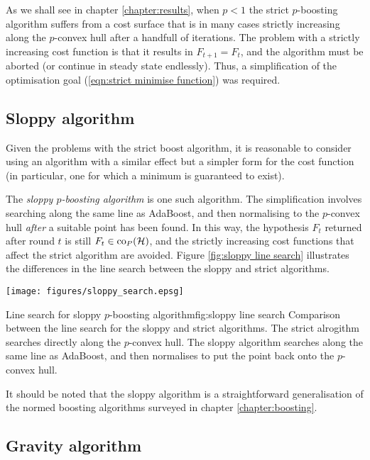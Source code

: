 As we shall see in chapter \ref{chapter:results}, when $p < 1$ the
strict $p$-boosting algorithm suffers from a cost surface that is in
many cases strictly increasing along the $p$-convex hull after a
handfull of iterations.  The problem with a strictly increasing cost
function is that it results in $F_{t+1} = F_t$, and the algorithm must
be aborted (or continue in steady state endlessly).  Thus, a
simplification of the optimisation goal (\ref{eqn:strict minimise
function}) was required.


\subsection{Sloppy algorithm}

Given the problems with the strict boost algorithm, it is reasonable
to consider using an algorithm with a similar effect but a simpler
form for the cost function (in particular, one for which a minimum is
guaranteed to exist).

The \emph{sloppy $p$-boosting algorithm} is one such algorithm.  The
simplification involves searching along the same line as AdaBoost, and
then normalising to the $p$-convex hull \emph{after} a suitable point
has been found.  In this way, the hypothesis $F_t$ returned after
round $t$ is still $F_t \in \mathrm{co}_P(\mathcal{H})$, and the strictly increasing
cost functions that affect the strict algorithm are avoided.  Figure
\ref{fig:sloppy line search} illustrates the differences in the line
search between the sloppy and strict algorithms.

\begin{linefigure}
\begin{center}
\texttt{[image: figures/sloppy\_search.epsg]}
\end{center}
\begin{capt}{Line search for sloppy $p$-boosting algorithm}{fig:sloppy line search}
Comparison between the line search for the sloppy and strict
algorithms.  The strict alrogithm searches directly along the
$p$-convex hull.  The sloppy algorithm searches along the same line as
AdaBoost, and then normalises to put the point back onto the
$p$-convex hull.
\end{capt}
\end{linefigure}

It should be noted that the sloppy algorithm is a straightforward
generalisation of the normed boosting algorithms surveyed in chapter
\ref{chapter:boosting}.


\subsection{Gravity algorithm}

